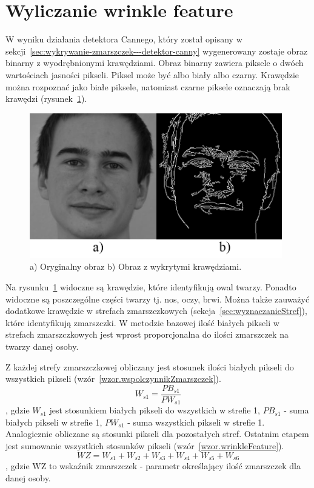 \documentclass[a4paper,twoside,12pt]{book}
\begin{document}
    \section{Wyliczanie wrinkle feature}\label{sec:wyliczanieWrinkleFeature}
    W wyniku działania detektora Cannego, który został opisany w sekcji~\ref{sec:wykrywanie-zmarszczek---detektor-canny}
    wygenerowany zostaje obraz binarny z wyodrębnionymi krawędziami.
    Obraz binarny zawiera piksele o dwóch wartościach jasności pikseli.
    Piksel może być albo biały albo czarny.
    Krawędzie można rozpoznać jako białe piksele, natomiast czarne piksele oznaczają brak krawędzi (rysunek~\ref{fig.mojaTwarzGray}).

    \begin{figure}[h!]
        \centering
        \includegraphics[width=11cm]{Obrazy/mojaTwarzGray.jpg}
        \caption{a) Oryginalny obraz b) Obraz z wykrytymi krawędziami.} %
        \label{fig.mojaTwarzGray}
    \end{figure}

    Na rysunku~\ref{fig.mojaTwarzGray} widoczne są krawędzie, które identyfikują owal twarzy.
    Ponadto widoczne są poszczególne części twarzy tj. nos, oczy, brwi.
    Można także zauważyć dodatkowe krawędzie w strefach zmarszczkowych (sekcja~\ref{sec:wyznaczanieStref}),
    które identyfikują zmarszczki.
    W metodzie bazowej ilość białych pikseli w strefach zmarszczkowych jest wprost proporcjonalna do ilości zmarszczek
    na twarzy danej osoby.

    Z każdej strefy zmarszczkowej obliczany jest stosunek ilości białych pikseli do wszystkich
    pikseli (wzór~\ref{wzor.wspolczynnikZmarszczek}).
    \large
    \begin{equation}
        W_{s1} = \frac{PB_{s1}}{PW_{s1}}
        \label{wzor.wspolczynnikZmarszczek}
    \end{equation}
    \normalsize
    , gdzie $W_{s1}$ jest stosunkiem białych pikseli do wszystkich w strefie 1,
    $PB_{s1}$ - suma białych pikseli w strefie 1, $PW_{s1}$ - suma wszystkich pikseli w strefie 1.
    Analogicznie obliczane są stosunki pikseli dla pozostałych stref.
    Ostatnim etapem jest sumowanie wszystkich stosunków pikseli (wzór~\ref{wzor.wrinkleFeature}).
    \large
    \begin{equation}
        WZ = W_{s1} + W_{s2} + W_{s3} + W_{s4} + W_{s5} + W_{s6}
        \label{wzor.wrinkleFeature}
    \end{equation}
    \normalsize
    , gdzie WZ to wskaźnik zmarszczek - parametr określający ilość zmarszczek dla danej osoby.
\end{document}
